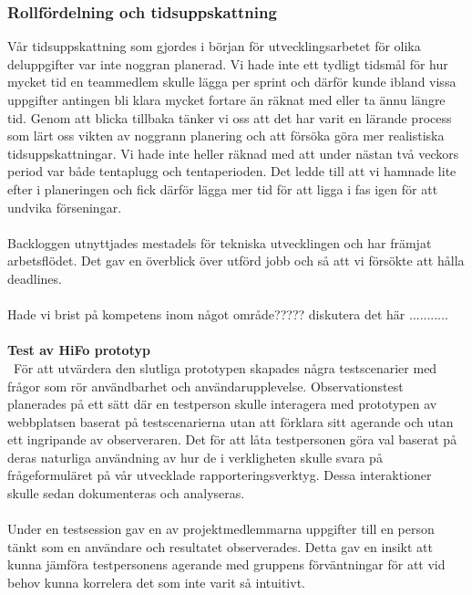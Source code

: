 \documentclass[12pt]{article}
\begin{document}
\subsubsection{Rollfördelning och tidsuppskattning}
Vår tidsuppskattning som gjordes i början för utvecklingsarbetet för olika deluppgifter var inte noggran planerad. Vi hade inte ett tydligt tidsmål för hur mycket tid en teammedlem skulle lägga per sprint och därför kunde ibland vissa uppgifter antingen bli klara mycket fortare än räknat med eller ta ännu längre tid. Genom att blicka tillbaka tänker vi oss att det har varit en lärande process som lärt oss vikten av noggrann planering och att försöka göra mer realistiska tidsuppskattningar. Vi hade inte heller räknad med att under nästan två veckors period var både tentaplugg och tentaperioden. Det ledde till att vi hamnade lite efter i planeringen och fick därför lägga mer tid för att ligga i fas igen för att undvika förseningar.\\\\
Backloggen utnyttjades mestadels för tekniska utvecklingen och har främjat arbetsflödet. Det gav en överblick över utförd jobb och så att vi försökte att hålla deadlines.\\\\
Hade vi brist på kompetens inom något område????? diskutera det här ........... \\\\
\textbf{Test av HiFo prototyp }\\\
För att utvärdera den slutliga prototypen skapades några testscenarier med frågor som rör användbarhet och användarupplevelse. Observationstest planerades på ett sätt där en  testperson skulle interagera med prototypen av webbplatsen baserat på testscenarierna utan att förklara sitt agerande och utan ett ingripande av observeraren. Det för att låta testpersonen göra val baserat på deras naturliga användning av hur de i verkligheten skulle svara på frågeformuläret på vår utvecklade rapporteringsverktyg. Dessa interaktioner skulle sedan dokumenteras och  analyseras.\\\\
Under en testsession gav en av projektmedlemmarna uppgifter till en person tänkt som en användare och resultatet observerades. Detta gav en insikt att kunna jämföra testpersonens agerande med gruppens förväntningar för att vid behov kunna korrelera det som inte varit så intuitivt.\\\\
\end{document}
